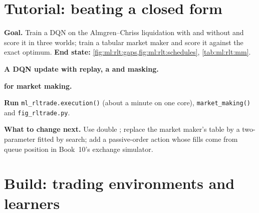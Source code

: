 \section{Tutorial: beating a closed form}\label{tut:ml:reinforcement-learning-for-execution-and-market-making:tut}

\begin{tutorial}
\textbf{Goal.} Train a DQN on the Almgren--Chriss liquidation with and without  and score it in three
worlds; train a tabular market maker and score it against the exact optimum. \textbf{End state:}
\cref{fig:ml:rlt:gaps,fig:ml:rlt:schedules}, \cref{tab:ml:rlt:mm}.
\begin{tutsteps}
\item \textbf{A DQN update with replay, a  and masking.}
\label{lst:ml:rlt:dqn}
\item \textbf{ for market making.}
\label{lst:ml:rlt:mm}
\item \textbf{Run} \texttt{ml\_rltrade.execution()} (about a minute on one core), \texttt{market\_making()} and
\texttt{fig\_rltrade.py}.
\end{tutsteps}
\textbf{What to change next.} Use double ; replace the market maker's table by a two-parameter  fitted by
 search; add a passive-order action whose fills come from queue position in Book~10's exchange simulator.
\end{tutorial}

\section{Build: trading environments and learners}\label{bld:ml:reinforcement-learning-for-execution-and-market-making:rltrade}

